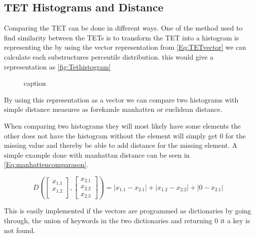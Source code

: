 \subsection{TET Histograms and Distance}
	Comparing the TET can be done in different ways. One of the method used to find similarity between the TETs is to transform the TET into a histogram is representing the by using the vector representation from \autoref{Eq:TETvector} we can calculate each substructures percentile distribution. this would give a representation as \autoref{fig:Tethistogram}
	
	\begin{figure}[H]
		\centering
		\begin{adjustbox}{width=0.5\textwidth}
			
		\end{adjustbox}
		\caption{caption}
		\label{fig:Tethistogram}
	\end{figure}
	
	By using this representation as a vector we can compare two histograms with simple distance measures as forekamle manhatten or euclidean distance.
	
	When comparing two histograms they will most likely have some elements the other does not have the histogram without the element will simply get 0 for the missing value and thereby be able to add distance for the missing element. A simple example done with manhattan distance can be seen in \autoref{Eq:manhattencomparason}.
	
	\begin{equation}\label{Eq:manhattencomparason}
	D(\begin{bmatrix}
	x_{1.1} \\
	x_{1.2} \\
	\end{bmatrix},
	\begin{bmatrix}
	x_{2.1} \\
	x_{2.2} \\
	x_{2.3}
	\end{bmatrix})= |x_{1.1} - x_{2.1}| + |x_{1.2} - x_{2.2}| + |0 - x_{2.1}|
	\end{equation}
	
	This is easily implemented if the vectors are programmed as dictionaries by going through, the union of keywords in the two dictionaries and returning 0 it a key is not found.
